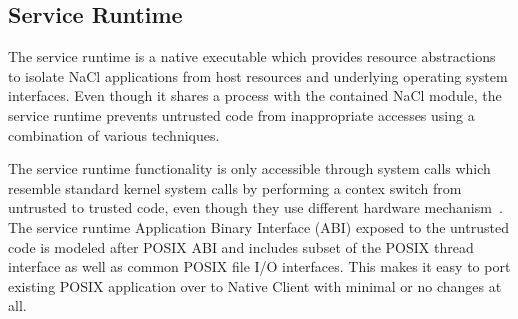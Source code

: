 
\subsection{Service Runtime}

The service runtime is a native executable which provides resource
abstractions to isolate NaCl applications from host resources and
underlying operating system interfaces. Even though it shares a process
with the contained NaCl module, the service runtime prevents untrusted
code from inappropriate accesses using a combination of various
techniques. %

The service runtime functionality is only accessible through system
calls which resemble standard kernel system calls by performing a contex
switch from untrusted to trusted code, even though they use different
hardware mechanism~\cite{yee:ieee-sp09,sehr:usenix-sec10}. The service
runtime Application Binary Interface (ABI) exposed to the untrusted code
is modeled after POSIX ABI and includes subset of the POSIX thread
interface as well as common POSIX file I/O interfaces. This makes it
easy to port existing POSIX application over to Native Client with
minimal or no changes at all.



